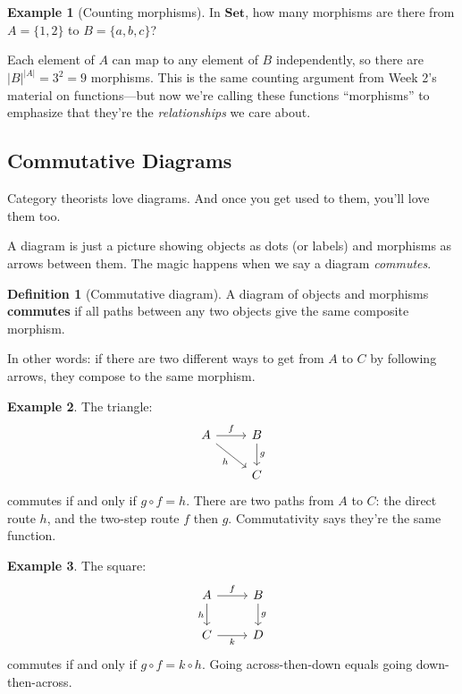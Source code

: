 \documentclass[11pt]{article}
\newcommand{\cat}[1]{\mathbf{#1}}
\newcommand{\Set}{\cat{Set}}
\theoremstyle{definition}
\newtheorem{definition}{Definition}[section]
\newtheorem{example}{Example}[section]
\theoremstyle{plain}
\theoremstyle{remark}
\begin{document}
\begin{example}[Counting morphisms]
In $\Set$, how many morphisms are there from $A = \{1, 2\}$ to $B = \{a, b, c\}$?

Each element of $A$ can map to any element of $B$ independently, so there are $|B|^{|A|} = 3^2 = 9$ morphisms. This is the same counting argument from Week 2's material on functions---but now we're calling these functions ``morphisms'' to emphasize that they're the \emph{relationships} we care about.
\end{example}

\subsection{Commutative Diagrams}

Category theorists love diagrams. And once you get used to them, you'll love them too.

A diagram is just a picture showing objects as dots (or labels) and morphisms as arrows between them. The magic happens when we say a diagram \emph{commutes}.

\begin{definition}[Commutative diagram]
A diagram of objects and morphisms \textbf{commutes} if all paths between any two objects give the same composite morphism.
\end{definition}

In other words: if there are two different ways to get from $A$ to $C$ by following arrows, they compose to the same morphism.

\begin{example}
The triangle:
\[
\begin{tikzcd}
A \arrow[r, "f"] \arrow[dr, "h"'] & B \arrow[d, "g"] \\
 & C
\end{tikzcd}
\]
commutes if and only if $g \circ f = h$. There are two paths from $A$ to $C$: the direct route $h$, and the two-step route $f$ then $g$. Commutativity says they're the same function.
\end{example}

\begin{example}
The square:
\[
\begin{tikzcd}
A \arrow[r, "f"] \arrow[d, "h"'] & B \arrow[d, "g"] \\
C \arrow[r, "k"'] & D
\end{tikzcd}
\]
commutes if and only if $g \circ f = k \circ h$. Going across-then-down equals going down-then-across.
\end{example}
\end{document}
